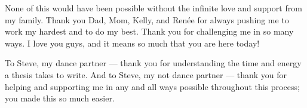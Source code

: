 \begin{preamble}
\begin{acknowledgments}
None of this would have been possible without the infinite love and support from 
my family.  Thank you Dad, Mom, Kelly, and Ren\'{e}e for always pushing me to 
work my hardest and to do my best.  Thank you for challenging me in so many 
ways.  I love you guys, and it means so much that you are here today!

To Steve, my dance partner --- thank you for understanding the time and energy 
a thesis takes to write.  And to Steve, my not dance partner --- thank you for 
helping and supporting me in any and all ways possible throughout this process; 
you made this so much easier.
\end{acknowledgments}

\iffinal{}{\newpage}


\tableofcontents

\iffinal{}{\newpage}


\listoftables

\iffinal{}{\newpage}


\listoffigures

\iffinal{}{\newpage}


\begin{abstract}


\end{abstract}
\end{preamble}
